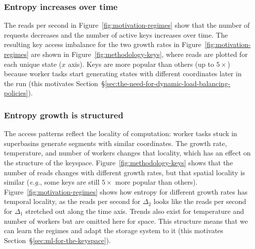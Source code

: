 \subsubsection*{Entropy increases over time} The reads per second in
Figure~\ref{fig:motivation-regimes} show that the number of requests decreases
and the number of active keys increases over time. The resulting key access
imbalance for the two growth rates in Figure~\ref{fig:motivation-regimes} are
shown in Figure~\ref{fig:methodology-keys}, where reads are plotted for each
unique state (\(x\) axis). Keys are more popular than others (up to
\(5\times\)) because worker tasks start generating states with different
coordinates later in the run (this motivates
Section~\S\ref{sec:the-need-for-dynamic-load-balancing-policies}).

\subsubsection*{Entropy growth is structured} The access patterns reflect the
locality of computation: worker tasks stuck in superbasins generate segments with
similar coordinates. The growth rate, temperature, and number of workers
changes that locality, which has an effect on the structure of the keyspace.
Figure~\ref{fig:methodology-keys} shows that the number of reads changes with
different growth rates, but that spatial locality is similar ({\it e.g.}, some
keys are still \(5\times\) more popular than others).
Figure~\ref{fig:motivation-regimes} shows how entropy for different growth
rates has temporal locality, as the reads per second for \(\Delta_2\) looks like the
reads per second for \(\Delta_1\) stretched out along the time axis.  Trends also exist
for temperature and number of workers but are omitted here for space. This
structure means that we can learn the regimes and adapt the storage system to
it (this motivates Section~\S\ref{sec:ml-for-the-keyspace}).
